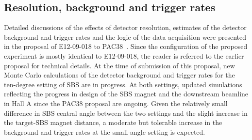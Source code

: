 \subsection{Resolution, background and trigger rates}
Detailed discussions of the effects of detector resolution, estimates of the detector background and trigger rates and the logic of the data acquisition were presented in the proposal of E12-09-018 to PAC38~\cite{SBS_SIDIS}. Since the configuration of the proposed experiment is mostly identical to E12-09-018, the reader is referred to the earlier proposal for technical details. At the time of submission of this proposal, new Monte Carlo calculations of the detector background and trigger rates for the ten-degree setting of SBS are in progress. At both settings, updated simulations reflecting the progress in design of the SBS magnet and the downstream beamline in Hall A since the PAC38 proposal are ongoing. Given the relatively small difference in SBS central angle between the two settings and the slight increase in the target-SBS magnet distance, a moderate but tolerable increase in the background and trigger rates at the small-angle setting is expected.  

